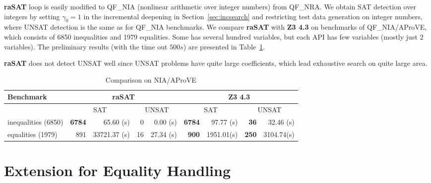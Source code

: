 \documentclass[runningheads,a4paper,oribibl]{llncs}
\newcommand{\suppress}[1]{} %
\begin{document}
{\bf raSAT} loop is easily modified to QF\_NIA (nonlinear arithmetic over
integer numbers) from QF\_NRA.
We obtain SAT detection over integers by setting $\gamma_0 = 1$ in
the incremental deepening in Section~\ref{sec:incsearch} 
and restricting test data generation on integer numbers,
where UNSAT detection is the same as for QF\_NIA benchmarks. 
We compare {\bf raSAT} with {\bf Z3 4.3} on benchmarks of QF\_NIA/AProVE, 
which consists of 6850 inequalities and 1979 equalities. 
Some has several hundred variables, but each API has few variables
(mostly just 2 variables).
The preliminary results (with the time out $500s$) are presented in
Table~\ref{tab:aprove}. 
\suppress{
\begin{itemize}
\item {\bf raSAT} detects 6773 SAT in 90.22s, and 2 UNSAT in 378.04s. 
\item {\bf Z3 4.3} detects 6784 SAT in 97.70s, and 36 UNSAT in 32.08s. 
\end{itemize}
where the timeout is $500s$. 
}
{\bf raSAT} does not detect UNSAT well since UNSAT problems
have quite large coefficients, which lead exhaustive search on quite large area.
\begin{table}[t]
\centering
\begin{tabular}{ | l | r | r | r | r  | r | r | r | r |}
\hline
    \multicolumn{1}{|l|}{Benchmark} & 
    \multicolumn{4}{c|}{\bf raSAT} & \multicolumn{4}{c|}{\bf Z3 4.3}\\
\hline
    & \multicolumn{2}{c}{SAT} & \multicolumn{2}{|c}{UNSAT} 
    & \multicolumn{2}{|c}{SAT} & \multicolumn{2}{|c|}{UNSAT} \\
\hline
inequalities (6850) & \textbf{6784} & 65.60 (s) & 0 & 0.00 (s) &
\textbf{6784} & 97.77 (s) & \textbf{36} & 32.46 (s) 
\\
\hline
equalities (1979) & 891 & 33721.37 (s) & 16 & 27.34 (s) &
\textbf{900} & 1951.01(s) & \textbf{250} & 3104.74(s) 
\\
\hline
\end{tabular}
\medskip 
\caption{Comparison on NIA/AProVE} \label{tab:aprove}
\end{table}


\section{Extension for Equality Handling} \label{sec:eq}
\end{document}
